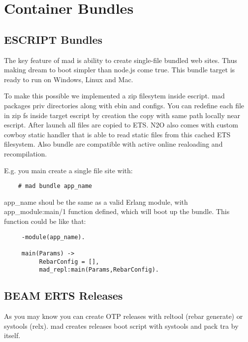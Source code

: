 \section{Container Bundles}

\subsection{ESCRIPT Bundles}

The key feature of mad is ability to create single-file bundled web sites.
Thus making dream to boot simpler than node.js come true.
This bundle target is ready to run on Windows, Linux and Mac.

To make this possible we implemented a zip filesytem inside escript.
mad packages priv directories along with ebin and configs.
You can redefine each file in zip fs inside target
escript by creation the copy with same path locally near escript.
After launch all files are copied to ETS.
N2O also comes with custom cowboy static handler that is able to
read static files from this cached ETS filesystem.
Also bundle are compatible with active online realoading and recompilation.

E.g. you main create a single file site with:

\vspace{1\baselineskip}
\begin{lstlisting}
    # mad bundle app_name
\end{lstlisting}
\vspace{1\baselineskip}

app\_name shoul be the same as a valid Erlang module, with app\_module:main/1
function defined, which will boot up the bundle. This function could be like that:

\vspace{1\baselineskip}
\begin{lstlisting}
     -module(app_name).

     main(Params) ->
          RebarConfig = [],
          mad_repl:main(Params,RebarConfig).
\end{lstlisting}
\vspace{1\baselineskip}

\subsection{BEAM ERTS Releases}

As you may know you can create OTP releases with
reltool (rebar generate) or systools (relx). mad creates releases boot
script with systools and pack tra by itself.

